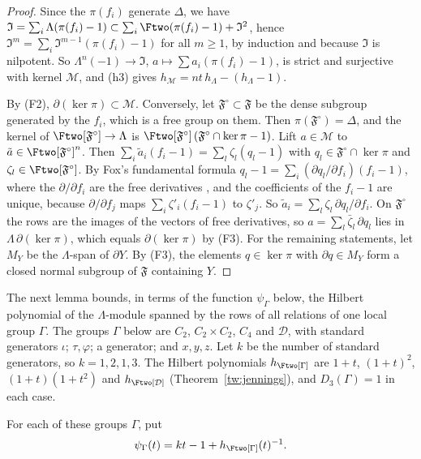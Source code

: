 \begin{proof}
Since the $\pi(f_i)$ generate $\Delta$, we have
$\mathfrak I=\sum_i\Lambda(\pi(f_i)-1)\subset\sum_i\Ftwo(\pi(f_i)-1)+\mathfrak I^2$,
hence $\mathfrak I^m=\sum_i\mathfrak I^{m-1}(\pi(f_i)-1)$ for all $m\ge1$, by
induction and because $\mathfrak I$ is nilpotent. So
$\Lambda^n(-1)\to\mathfrak I$, $a\mapsto\sum a_i(\pi(f_i)-1)$, is strict and
surjective with kernel $\mathcal M$, and (h3) gives
$h_{\mathcal M}=nt\,h_\Lambda-(h_\Lambda-1)$.

By (F2), $\partial(\ker\pi)\subset\mathcal M$. Conversely, let
$\mathfrak F^\circ\subset\mathfrak F$ be the dense subgroup generated by the
$f_i$, which is a free group on them. Then $\pi(\mathfrak F^\circ)=\Delta$, and
the kernel of $\Ftwo[\mathfrak F^\circ]\to\Lambda$ is
$\Ftwo[\mathfrak F^\circ]\,(\mathfrak F^\circ\cap\ker\pi-1)$. Lift
$a\in\mathcal M$ to $\tilde a\in\Ftwo[\mathfrak F^\circ]^n$. Then
$\sum_i\tilde a_i(f_i-1)=\sum_l\zeta_l(q_l-1)$ with
$q_l\in\mathfrak F^\circ\cap\ker\pi$ and $\zeta_l\in\Ftwo[\mathfrak F^\circ]$.
By Fox's fundamental formula
$q_l-1=\sum_i(\partial q_l/\partial f_i)(f_i-1)$, where the
$\partial/\partial f_i$ are the free derivatives \cite[Section~2]{Fox1953},
and the coefficients of the $f_i-1$ are unique, because $\partial/\partial f_j$
maps $\sum_i\zeta'_i(f_i-1)$ to $\zeta'_j$. So
$\tilde a_i=\sum_l\zeta_l\,\partial q_l/\partial f_i$. On $\mathfrak F^\circ$
the rows are the images of the vectors of free derivatives, so
$a=\sum_l\bar\zeta_l\,\partial q_l$ lies in $\Lambda\,\partial(\ker\pi)$, which
equals $\partial(\ker\pi)$ by (F3). For the remaining statements, let $M_Y$ be
the $\Lambda$-span of $\partial Y$. By (F3), the elements $q\in\ker\pi$ with
$\partial q\in M_Y$ form a closed normal subgroup of $\mathfrak F$ containing
$Y$.
\end{proof}

The next lemma bounds, in terms of the function $\psi_\Gamma$ below, the
Hilbert polynomial of the $\Lambda$-module spanned by the rows of all
relations of one local group $\Gamma$. The groups
$\Gamma$ below are $C_2$, $C_2\times C_2$, $C_4$ and $\mathcal D$, with standard
generators $\iota$; $\tau,\varphi$; a generator; and $x,y,z$. Let $k$ be the
number of standard generators, so $k=1,2,1,3$. The Hilbert polynomials
$h_{\Ftwo[\Gamma]}$ are $1+t$, $(1+t)^2$, $(1+t)(1+t^2)$ and $h_{\Ftwo[\mathcal D]}$
(Theorem~\ref{tw:jennings}), and $D_3(\Gamma)=1$ in each case.

\begin{definition}\label{tw:psi}
For each of these groups $\Gamma$, put
\[
 \psi_\Gamma(t)=kt-1+h_{\Ftwo[\Gamma]}(t)^{-1}.
\]
\end{definition}

